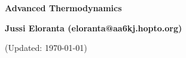 \documentclass[serif]{beamer}
\begin{document}
\phantom{hauki}
\vfill
\begin{center}
\textbf{Advanced Thermodynamics}\\

\vspace{1cm}

\textbf{Jussi Eloranta (eloranta@aa6kj.hopto.org)}\\

\vspace{1cm}

{\tiny (Updated: \today)}

\end{center}
\vfill
\newpage




%
%
%
%
%
%
%

%
\end{document}
